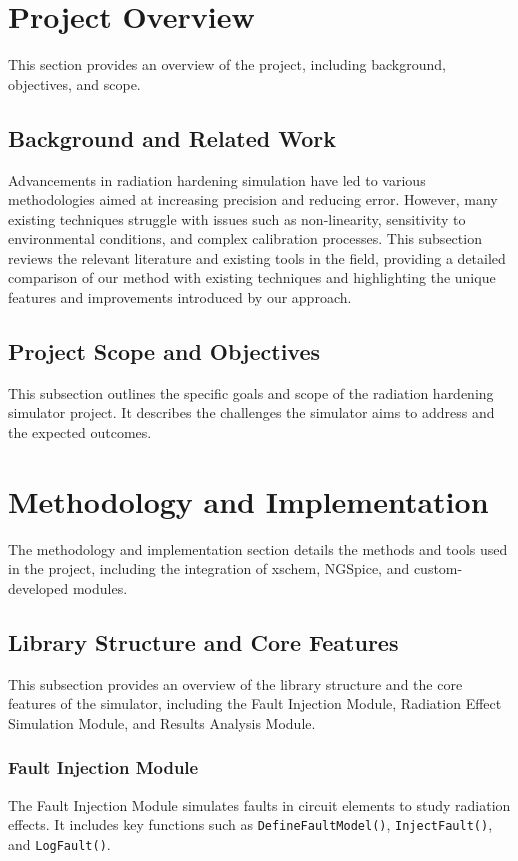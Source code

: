 \documentclass[conference]{IEEEtran}
\begin{document}
\section{Project Overview}
This section provides an overview of the project, including background, objectives, and scope.

\subsection{Background and Related Work}
Advancements in radiation hardening simulation have led to various methodologies aimed at increasing precision and reducing error. However, many existing techniques struggle with issues such as non-linearity, sensitivity to environmental conditions, and complex calibration processes. This subsection reviews the relevant literature and existing tools in the field, providing a detailed comparison of our method with existing techniques and highlighting the unique features and improvements introduced by our approach.

\subsection{Project Scope and Objectives}
This subsection outlines the specific goals and scope of the radiation hardening simulator project. It describes the challenges the simulator aims to address and the expected outcomes.

\section{Methodology and Implementation}
The methodology and implementation section details the methods and tools used in the project, including the integration of xschem, NGSpice, and custom-developed modules.

\subsection{Library Structure and Core Features}
This subsection provides an overview of the library structure and the core features of the simulator, including the Fault Injection Module, Radiation Effect Simulation Module, and Results Analysis Module.

\subsubsection{Fault Injection Module}
The Fault Injection Module simulates faults in circuit elements to study radiation effects. It includes key functions such as \texttt{DefineFaultModel()}, \texttt{InjectFault()}, and \texttt{LogFault()}.
\end{document}

